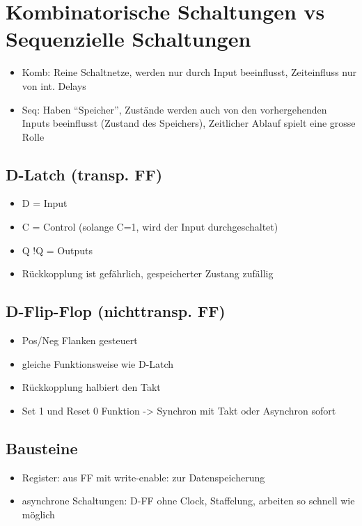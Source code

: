 
\section*{Kombinatorische Schaltungen vs Sequenzielle Schaltungen}
\begin{itemize}
\item Komb: Reine Schaltnetze, werden nur durch Input beeinflusst, Zeiteinfluss
nur von int. Delays
\item Seq: Haben ``Speicher'', Zustände werden auch von den vorhergehenden
Inputs beeinflusst (Zustand des Speichers), Zeitlicher Ablauf spielt
eine grosse Rolle
\end{itemize}

\subsection*{D-Latch (transp. FF)}
\begin{itemize}
\item D = Input
\item C = Control (solange C=1, wird der Input durchgeschaltet)
\item Q !Q = Outputs
\item Rückkopplung ist gefährlich, gespeicherter Zustang zufällig
\end{itemize}

\subsection*{D-Flip-Flop (nichttransp. FF)}
\begin{itemize}
\item Pos/Neg Flanken gesteuert
\item gleiche Funktionsweise wie D-Latch
\item Rückkopplung halbiert den Takt
\item Set 1 und Reset 0 Funktion -> Synchron mit Takt oder Asynchron sofort
\end{itemize}

\subsection*{Bausteine}
\begin{itemize}
\item Register: aus FF mit write-enable: zur Datenspeicherung
\item asynchrone Schaltungen: D-FF ohne Clock, Staffelung, arbeiten so schnell
wie möglich\end{itemize}

